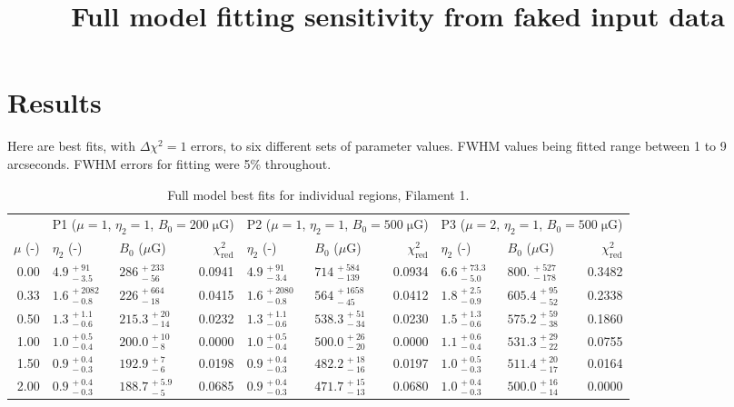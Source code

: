 \documentclass[manuscript]{aastex}  %
\newcommand*{\mt}{\mathrm}
\newcommand*{\unit}[1]{\;\mt{#1}}  %
\begin{document}
\title{Full model fitting sensitivity from faked input data}

\section{Results}

Here are best fits, with $\Delta\chi^2 = 1$ errors, to six different sets of
parameter values.  FWHM values being fitted range between 1 to 9
arcseconds.  FWHM errors for fitting were 5\% throughout.

\begin{table*}[ht!]
    \scriptsize
    \centering
    \caption{Full model best fits for individual regions, Filament 1.
    \label{tab:fits}}

    \begin{tabular}{@{}rllrllrllr@{}}
    \toprule
    {} & \multicolumn{3}{c}{P1 ($\mu=1$, $\eta_2=1$, $B_0=200 \unit{\mu G}$)}
       & \multicolumn{3}{c}{P2 ($\mu=1$, $\eta_2=1$, $B_0=500 \unit{\mu G}$)}
       & \multicolumn{3}{c}{P3 ($\mu=2$, $\eta_2=1$, $B_0=500 \unit{\mu G}$)} \\
    \cmidrule(lr){2-4} \cmidrule(lr){5-7} \cmidrule(l){8-10}
    $\mu$ (-) & $\eta_2$ (-) & $B_0$ ($\mu$G) & $\chi^2_{\mt{red}}$
              & $\eta_2$ (-) & $B_0$ ($\mu$G) & $\chi^2_{\mt{red}}$
              & $\eta_2$ (-) & $B_0$ ($\mu$G) & $\chi^2_{\mt{red}}$ \\
    \cmidrule{1-10}
    0.00 & ${4.9}^{\,+91}_{\,-3.5}$ & ${286}^{\,+233}_{\,-56}$ & 0.0941
         & ${4.9}^{\,+91}_{\,-3.4}$ & ${714}^{\,+584}_{\,-139}$ & 0.0934
         & ${6.6}^{\,+73.3}_{\,-5.0}$ & ${800.}^{\,+527}_{\,-178}$ & 0.3482 \\[0.5em]
    0.33 & ${1.6}^{\,+2082}_{\,-0.8}$ & ${226}^{\,+664}_{\,-18}$ & 0.0415
         & ${1.6}^{\,+2080}_{\,-0.8}$ & ${564}^{\,+1658}_{\,-45}$ & 0.0412
         & ${1.8}^{\,+2.5}_{\,-0.9}$ & ${605.4}^{\,+95}_{\,-52}$ & 0.2338 \\[0.5em]
    0.50 & ${1.3}^{\,+1.1}_{\,-0.6}$ & ${215.3}^{\,+20}_{\,-14}$ & 0.0232
         & ${1.3}^{\,+1.1}_{\,-0.6}$ & ${538.3}^{\,+51}_{\,-34}$ & 0.0230
         & ${1.5}^{\,+1.3}_{\,-0.6}$ & ${575.2}^{\,+59}_{\,-38}$ & 0.1860 \\[0.5em]
    1.00 & ${1.0}^{\,+0.5}_{\,-0.4}$ & ${200.0}^{\,+10}_{\,-8}$ & 0.0000
         & ${1.0}^{\,+0.5}_{\,-0.4}$ & ${500.0}^{\,+26}_{\,-20}$ & 0.0000
         & ${1.1}^{\,+0.6}_{\,-0.4}$ & ${531.3}^{\,+29}_{\,-22}$ & 0.0755 \\[0.5em]
    1.50 & ${0.9}^{\,+0.4}_{\,-0.3}$ & ${192.9}^{\,+7}_{\,-6}$ & 0.0198
         & ${0.9}^{\,+0.4}_{\,-0.3}$ & ${482.2}^{\,+18}_{\,-16}$ & 0.0197
         & ${1.0}^{\,+0.5}_{\,-0.3}$ & ${511.4}^{\,+20}_{\,-17}$ & 0.0164 \\[0.5em]
    2.00 & ${0.9}^{\,+0.4}_{\,-0.3}$ & ${188.7}^{\,+5.9}_{\,-5}$ & 0.0685
         & ${0.9}^{\,+0.4}_{\,-0.3}$ & ${471.7}^{\,+15}_{\,-13}$ & 0.0680
         & ${1.0}^{\,+0.4}_{\,-0.3}$ & ${500.0}^{\,+16}_{\,-14}$ & 0.0000 \\


\end{tabular}
\end{table*}
\end{document}
